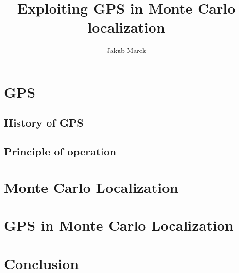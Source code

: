 \documentclass[12pt,a4paper,pdftex,twoside]{memoir}
\title{Exploiting GPS in Monte Carlo localization}
\author{Jakub Marek}
\begin{document}






\chapter{GPS}

\section{History of GPS}

\section{Principle of operation}


\chapter{Monte Carlo Localization}

\chapter{GPS in Monte Carlo Localization}

\chapter{Conclusion}


\end{document}
